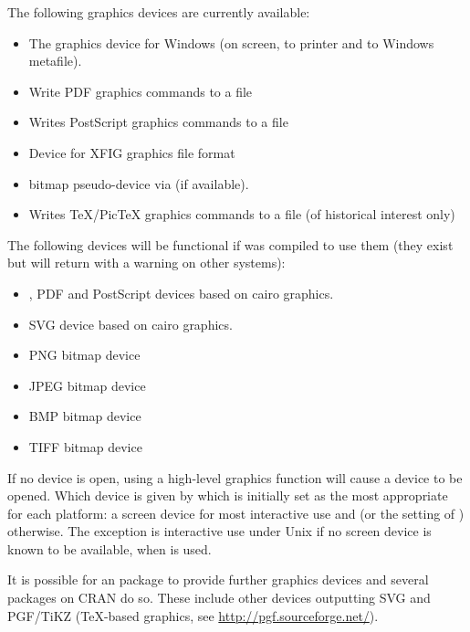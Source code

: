 \begin{Description}\relax
The following graphics devices are currently available:
\begin{itemize}

\item {} The graphics device for Windows (on screen,
to printer and to Windows metafile).
\item {} Write PDF graphics commands to a file
\item {} Writes PostScript graphics commands to
a file
\item {} Device for XFIG graphics file format
\item {} bitmap pseudo-device via
 (if available).
\item {} Writes TeX/PicTeX graphics commands to a
file (of historical interest only)

\end{itemize}

The following devices will be functional if \R{} was compiled to use
them (they exist but will return with a warning on other systems):
\begin{itemize}

\item {},  PDF and PostScript
devices based on cairo graphics.
\item {} SVG device based on cairo graphics.
\item {} PNG bitmap device
\item {} JPEG bitmap device
\item {} BMP bitmap device
\item {} TIFF bitmap device

\end{itemize}

\end{Description}
%
\begin{Details}\relax
If no device is open, using a high-level graphics function will cause
a device to be opened.  Which device is given by
 which is initially set as the most
appropriate for each platform: a screen device for most interactive use and
 (or the setting of )
otherwise.  The exception is interactive use under Unix if no screen
device is known to be available, when  is used.

It is possible for an \R{} package to provide further graphics devices
and several packages on CRAN do so.  These include other devices outputting
SVG and PGF/TiKZ (TeX-based graphics, see \url{http://pgf.sourceforge.net/}).
\end{Details}
